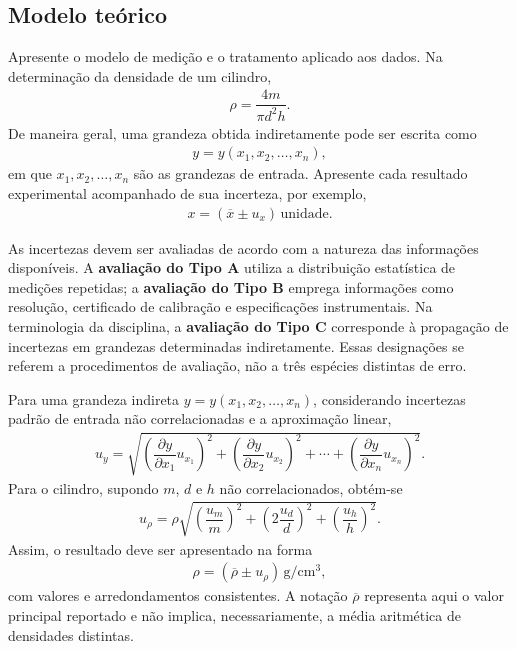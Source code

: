 \documentclass[aps,prb,12pt,onecolumn,amsmath,amssymb]{revtex4-2}
\begin{document}
\subsection{Modelo teórico}
Apresente o modelo de medição e o tratamento aplicado aos dados. Na determinação da densidade de um cilindro,
\begin{align}
    \rho = \dfrac{4m}{\pi d^2 h}.
\end{align}
De maneira geral, uma grandeza obtida indiretamente pode ser escrita como
\begin{align}
    y = y(x_1,x_2,\ldots,x_n),
\end{align}
em que $x_1,x_2,\ldots,x_n$ são as grandezas de entrada. Apresente cada resultado experimental acompanhado de sua incerteza, por exemplo,
\begin{align}
    x = \left(\overline{x} \pm u_x\right)\,\text{unidade}.
\end{align}

As incertezas devem ser avaliadas de acordo com a natureza das informações disponíveis. A \textbf{avaliação do Tipo A} utiliza a distribuição estatística de medições repetidas; a \textbf{avaliação do Tipo B} emprega informações como resolução, certificado de calibração e especificações instrumentais. Na terminologia da disciplina, a \textbf{avaliação do Tipo C} corresponde à propagação de incertezas em grandezas determinadas indiretamente. Essas designações se referem a procedimentos de avaliação, não a três espécies distintas de erro.

Para uma grandeza indireta $y = y(x_1,x_2,\ldots,x_n)$, considerando incertezas padrão de entrada não correlacionadas e a aproximação linear,
\begin{align}
    u_y = \sqrt{\left(\dfrac{\partial y}{\partial x_1}u_{x_1}\right)^2 + \left(\dfrac{\partial y}{\partial x_2}u_{x_2}\right)^2 + \cdots +
    \left(\dfrac{\partial y}{\partial x_n}u_{x_n}\right)^2}.
\end{align}
Para o cilindro, supondo $m$, $d$ e $h$ não correlacionados, obtém-se
\begin{align}
    u_\rho = \rho\sqrt{\left(\dfrac{u_m}{m}\right)^2 + \left(2\dfrac{u_d}{d}\right)^2 + \left(\dfrac{u_h}{h}\right)^2}.
\end{align}
Assim, o resultado deve ser apresentado na forma
\begin{align}
    \rho = (\overline{\rho}\pm u_\rho)\,\mathrm{g/cm^3},
\end{align}
com valores e arredondamentos consistentes. A notação $\overline{\rho}$ representa aqui o valor principal reportado e não implica, necessariamente, a média aritmética de densidades distintas.
\end{document}
